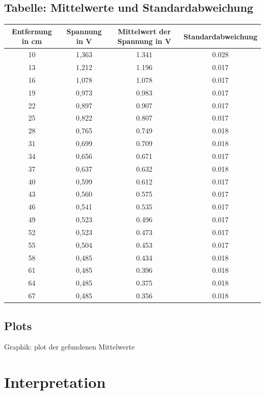 \subsection{Tabelle: Mittelwerte und Standardabweichung}
\label{chap: Tabllen_Auswertung}
\begin{center}

\begin{tabular}{|c|c|c|c|}
\hline 
Entfernung in cm & Spannung in V & Mittelwert der Spannung in V & Standardabweichung  \\ 
\hline 
10 & 1,363 & 1.341 & 0.028 \\ 
\hline 
13 & 1,212 & 1.196 & 0.017 \\ 
\hline 
16 & 1,078 & 1.078 & 0.017 \\ 
\hline 
19 & 0,973 & 0.983 & 0.017 \\ 

\hline 
22 & 0,897 & 0.907 & 0.017 \\ 
\hline 
25 & 0,822 & 0.807 & 0.017 \\ 
\hline 
28 & 0,765 & 0.749 & 0.018 \\ 
\hline 
31 & 0,699 & 0.709 & 0.018 \\ 
\hline 
34 & 0,656 & 0.671 & 0.017 \\ 
\hline 

37 & 0,637 & 0.632 & 0.018 \\ 
\hline 
40 & 0,599 & 0.612 & 0.017 \\ 
\hline 
43 & 0,560 & 0.575 & 0.017 \\ 
\hline 
46 & 0,541 & 0.535 & 0.017 \\ 

\hline 
49 & 0,523 & 0.496 & 0.017 \\ 
\hline 
52 & 0,523 & 0.473 & 0.017 \\ 
\hline 
55 & 0,504 & 0.453 & 0.017 \\ 
\hline 
58 & 0,485 & 0.434 & 0.018 \\ 

\hline 
61 & 0,485 & 0.396 & 0.018 \\ 
\hline 
64 & 0,485 & 0.375 & 0.018 \\ 
\hline 
67 & 0,485 & 0.356 & 0.018 \\ 
\hline 
\end{tabular} 
\label{Tabelle: Mittelwerte und Standardabweichung}
\end{center}

\subsection{Plots}
\label{Graphik: Plots vom Mittelwert und Standardabweichung}
	Graphik: plot der gefundenen Mittelwerte
	
\section{Interpretation}
	
\label{chap:VERSUCH_1_INTERPRETATION}
